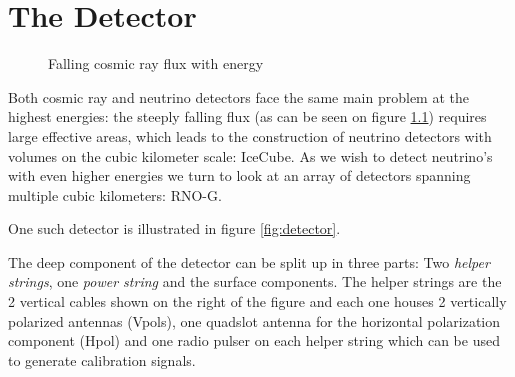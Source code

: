 \documentclass[11pt,a4paper,faculty=we,language=en,doctype=report]{cls/ugent-doc}
\begin{document}
\chapter{The Detector}
\begin{figure}
	\centering
	\caption{Falling cosmic ray flux with energy}
	\label{figure:FallingFlux}
\end{figure}
Both cosmic ray and neutrino detectors face the same main problem at the
highest energies: the steeply falling flux (as can be seen on figure \ref{figure:FallingFlux}) 
requires large effective areas, which
leads to the construction of neutrino detectors with volumes on the cubic
kilometer scale: IceCube. As we wish to detect neutrino's with even higher
energies we turn to look at an array of detectors spanning multiple cubic
kilometers: RNO-G.

One such detector is illustrated in figure \ref{fig:detector}.

The deep component of the detector can be split up in three parts: Two \textit{helper strings}, one \textit{power string} and the surface components. The helper strings are the 2 vertical cables shown on the right of the figure and each one houses 2 vertically polarized antennas (Vpols), one quadslot antenna for the horizontal polarization component (Hpol) and one radio pulser on each helper string which can be used to generate calibration signals.
\end{document}
